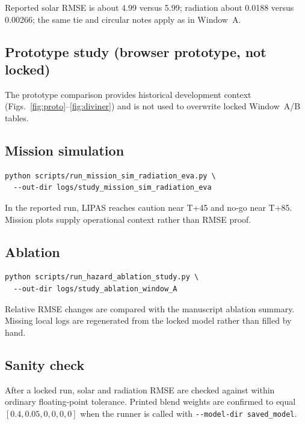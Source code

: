 Reported solar RMSE is about 4.99 versus 5.99; radiation about 0.0188 versus 0.00266; the same tie and circular notes apply as in Window~A.

\subsection*{Prototype study (browser prototype, not locked)}

The prototype comparison provides historical development context (Figs.~\ref{fig:proto}--\ref{fig:diviner}) and is not used to overwrite locked Window~A/B tables.

\subsection*{Mission simulation}

\begin{verbatim}
python scripts/run_mission_sim_radiation_eva.py \
  --out-dir logs/study_mission_sim_radiation_eva
\end{verbatim}

In the reported run, LIPAS reaches caution near T+45 and no-go near T+85. Mission plots supply operational context rather than RMSE proof.

\subsection*{Ablation}

\begin{verbatim}
python scripts/run_hazard_ablation_study.py \
  --out-dir logs/study_ablation_window_A
\end{verbatim}

Relative RMSE changes are compared with the manuscript ablation summary. Missing local logs are regenerated from the locked model rather than filled by hand.

\subsection*{Sanity check}

\begin{sloppypar}
After a locked run, solar and radiation RMSE are checked against  within ordinary floating-point tolerance. Printed blend weights are confirmed to equal $[0.4,0.05,0,0,0,0]$ when the runner is called with \verb|--model-dir saved_model|.
\end{sloppypar}
